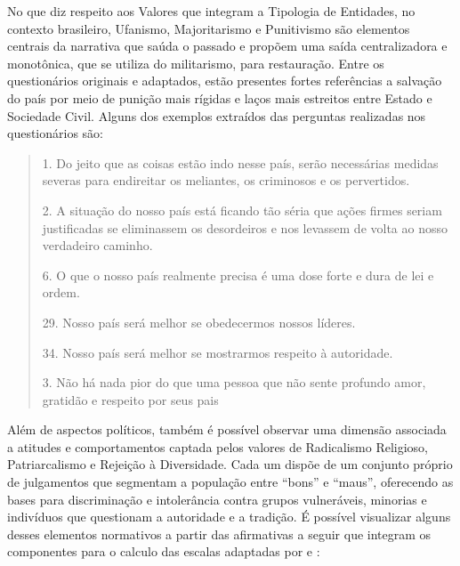 \documentclass[
12pt,				%
openright,			%
twoside,			%
a4paper,			%
english,			%
french,				%
spanish,			%
brazil				%
]{abntex2}
\begin{document}
No que diz respeito aos Valores que integram a Tipologia de Entidades, no contexto brasileiro, Ufanismo, Majoritarismo e Punitivismo são elementos centrais da narrativa que saúda o passado e propõem uma saída centralizadora e monotônica, que se utiliza do militarismo, para restauração. Entre os questionários originais e adaptados, estão presentes fortes referências a salvação do país por meio de punição mais rígidas e laços mais estreitos entre Estado e Sociedade Civil. Alguns dos exemplos extraídos das perguntas realizadas nos questionários são:

\begin{quote}
	1. Do jeito que as coisas estão indo nesse país, serão necessárias medidas severas para endireitar os meliantes, os criminosos e os pervertidos.
	
	2. A situação do nosso país está ficando tão séria que ações firmes seriam justificadas se eliminassem os desordeiros e nos levassem de volta ao nosso verdadeiro caminho.
	
	6. O que o nosso país realmente precisa é uma dose forte e dura de lei e ordem.
	
	29. Nosso país será melhor se obedecermos nossos líderes.
	
	34. Nosso país será melhor se mostrarmos respeito à autoridade.
	
	3. Não há nada pior do que uma pessoa que não sente profundo amor, gratidão e respeito por seus pais
	
	\cite{vilanova2018adaptaccao, de2018analises}
	
\end{quote}  

Além de aspectos políticos, também é possível observar uma dimensão associada a atitudes e comportamentos captada pelos valores de Radicalismo Religioso, Patriarcalismo e Rejeição à Diversidade. Cada um dispõe de um conjunto próprio de julgamentos que segmentam a população entre ``bons'' e ``maus'', oferecendo as bases para discriminação e intolerância contra grupos vulneráveis, minorias e indivíduos que questionam a autoridade e a tradição. É possível visualizar alguns desses elementos normativos a partir das afirmativas a seguir que integram os componentes para o calculo das escalas adaptadas por  e :
 
\end{document}

